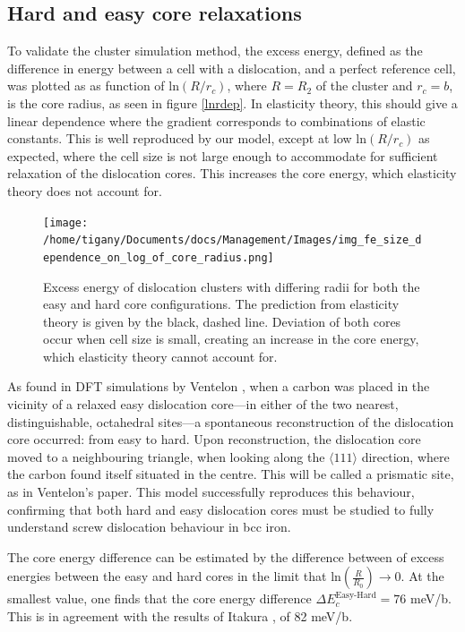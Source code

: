 \documentclass[a4paper,11pt]{article}
\begin{document}
\subsection{Hard and easy core relaxations}
\label{sec:org2f71f2d}


To validate the cluster simulation method, the excess energy, defined as the difference in energy between
a cell with a dislocation, and a perfect reference cell, was plotted as as function of
\(\text{ln}(R/r_c)\), where \(R = R_2\) of the cluster and \(r_c = b\), is the core radius, as seen in
figure \ref{lnrdep}. In
elasticity theory, this should give a linear dependence where the gradient corresponds to
combinations of elastic constants. This is well reproduced by our model, except at low
\(\text{ln}(R/r_c)\) as expected, where the cell size is not large enough to accommodate for sufficient
relaxation of the dislocation cores. This increases the core energy, which elasticity theory does
not account for.

\begin{figure}[htbp]
\centering
\texttt{[image: /home/tigany/Documents/docs/Management/Images/img\_fe\_size\_dependence\_on\_log\_of\_core\_radius.png]}
\caption{\label{fig:orgd008941}
Excess energy of dislocation clusters with differing radii for both the easy and hard core configurations. The prediction from elasticity theory is given by the black, dashed line. Deviation of both cores occur when cell size is small, creating an increase in the core energy, which elasticity theory cannot account for.}
\end{figure}




As found in DFT simulations by Ventelon \cite{Ventelon2015}, when a carbon was placed in the
vicinity of a relaxed easy dislocation core---in either of the two nearest, distinguishable,
octahedral sites---a spontaneous reconstruction of the dislocation core occurred: from easy to
hard. Upon reconstruction, the dislocation core moved to a neighbouring triangle, when looking along the \(\langle
   111\rangle\) direction, where the carbon found itself situated in the centre. This will be called a
prismatic site, as in Ventelon's paper. This model successfully
reproduces this behaviour, confirming that both hard and easy dislocation cores must be studied
to fully understand screw dislocation behaviour in bcc iron. 


The core energy difference can be estimated by the difference
between of excess energies between the easy and hard cores in the limit
that \(\text{ln}(\frac{R}{R_0}) \rightarrow 0\). At the smallest
value, one finds that the core energy difference \(\Delta
   E_c^{\text{Easy-Hard}} = 76\) meV/b. This is in agreement with the
results of Itakura \cite{Itakura2012}, of 82 meV/b.
\end{document}
